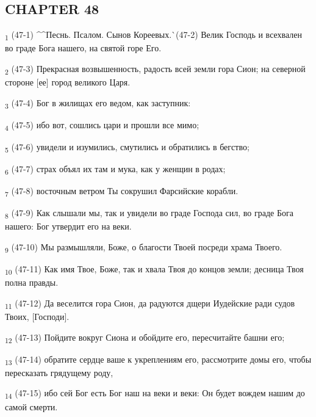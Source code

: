 \subsection{CHAPTER 48}
\begin{tcolorbox}
\textsubscript{1} (47-1) ^^Песнь. Псалом. Сынов Кореевых.^^ (47-2) Велик Господь и всехвален во граде Бога нашего, на святой горе Его.
\end{tcolorbox}
\begin{tcolorbox}
\textsubscript{2} (47-3) Прекрасная возвышенность, радость всей земли гора Сион; на северной стороне [ее] город великого Царя.
\end{tcolorbox}
\begin{tcolorbox}
\textsubscript{3} (47-4) Бог в жилищах его ведом, как заступник:
\end{tcolorbox}
\begin{tcolorbox}
\textsubscript{4} (47-5) ибо вот, сошлись цари и прошли все мимо;
\end{tcolorbox}
\begin{tcolorbox}
\textsubscript{5} (47-6) увидели и изумились, смутились и обратились в бегство;
\end{tcolorbox}
\begin{tcolorbox}
\textsubscript{6} (47-7) страх объял их там и мука, как у женщин в родах;
\end{tcolorbox}
\begin{tcolorbox}
\textsubscript{7} (47-8) восточным ветром Ты сокрушил Фарсийские корабли.
\end{tcolorbox}
\begin{tcolorbox}
\textsubscript{8} (47-9) Как слышали мы, так и увидели во граде Господа сил, во граде Бога нашего: Бог утвердит его на веки.
\end{tcolorbox}
\begin{tcolorbox}
\textsubscript{9} (47-10) Мы размышляли, Боже, о благости Твоей посреди храма Твоего.
\end{tcolorbox}
\begin{tcolorbox}
\textsubscript{10} (47-11) Как имя Твое, Боже, так и хвала Твоя до концов земли; десница Твоя полна правды.
\end{tcolorbox}
\begin{tcolorbox}
\textsubscript{11} (47-12) Да веселится гора Сион, да радуются дщери Иудейские ради судов Твоих, [Господи].
\end{tcolorbox}
\begin{tcolorbox}
\textsubscript{12} (47-13) Пойдите вокруг Сиона и обойдите его, пересчитайте башни его;
\end{tcolorbox}
\begin{tcolorbox}
\textsubscript{13} (47-14) обратите сердце ваше к укреплениям его, рассмотрите домы его, чтобы пересказать грядущему роду,
\end{tcolorbox}
\begin{tcolorbox}
\textsubscript{14} (47-15) ибо сей Бог есть Бог наш на веки и веки: Он будет вождем нашим до самой смерти.
\end{tcolorbox}
